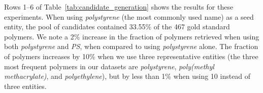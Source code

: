Rows 1--6 of Table~\ref{tab:candidate_generation} shows the results for these experiments.
When using \textit{polystyrene} (the most commonly used name) as a seed entity, the pool of candidates contained 33.55\% of the 467 gold standard polymers.
We note a 2\% increase in the fraction of polymers retrieved when using both \textit{polystyrene} and \textit{PS}, 
when compared to using \textit{polystyrene} alone. %
The fraction of polymers increases by 10\% when we use three representative entities 
(the three most frequent polymers in our datasets are \textit{polystyrene}, \textit{poly(methyl methacrylate)}, and \textit{polyethylene}), %
but by less than 1\% when using 10 instead of three entities.%

